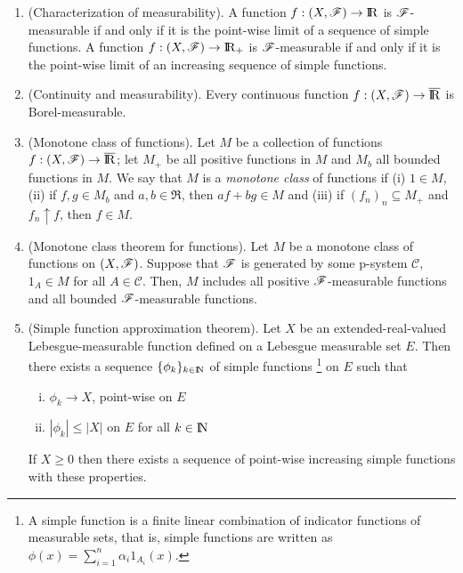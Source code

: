 \documentclass[a4paper,10pt]{article}
\begin{document}
\begin{enumerate}
 \item (Characterization of measurability). A function $f:(X,\F)\to\Re$ is $\mathscr{F}$-measurable if and only if 
       it is the point-wise limit of a sequence of simple functions. A function $f:(X,\F)\to\Re_+$ is 
       $\mathscr{F}$-measurable if and only if  it is the point-wise limit of an increasing sequence of simple functions. 
       
 \item (Continuity and measurability). Every continuous function $f:(X,\F)\to\barre$ is Borel-measurable. 
  
 \item (Monotone class of functions). Let $M$ be a collection of functions $f:(X,\F)\to\barre$; let $M_+$
       be all positive functions in $M$ and $M_b$ all bounded functions in $M$. We say that $M$ is a \textit{monotone class}
       of functions if (i) $1\in M$, (ii) if $f,g\in M_b$ and $a,b\in \Re$, then $af+bg\in M$ and (iii)
       if $(f_n)_n\subseteq M_+$ and $f_n \uparrow f$, then $f\in M$.
       
 \item (Monotone class theorem for functions). Let $M$ be a monotone class of functions on $(X,\mathscr{F})$. Suppose 
       that $\mathscr{F}$ is generated by some p-system $\mathcal{C}$, $1_A \in M$ for all $A\in\mathcal{C}$.
       Then, $M$ includes all positive $\mathscr{F}$-measurable functions and all bounded $\mathscr{F}$-measurable functions. 
       
 \item (Simple function approximation theorem).       
        Let $X$ be an extended-real-valued Lebesgue-measurable function defined on a Lebesgue measurable set $E$. 
        Then there exists a sequence $\{\phi_k\}_{k\in\N}$ of simple functions%
	    \footnote{A simple function is a finite linear combination of indicator functions of measurable sets, that is, 
	              simple functions are written as $\phi(x)=\sum_{i=1}^{n}\alpha_i 1_{A_i}(x)$. }
	 on $E$ such that
	\begin{enumerate}[i.]
	 \item $\phi_k\to X$, point-wise on $E$
	 \item $|\phi_k| \leq |X|$ on $E$ for all $k\in\N$
	\end{enumerate}
       If $X\geq 0$ then there exists a sequence of point-wise increasing simple functions with these properties.
       

\end{enumerate}
\end{document}
